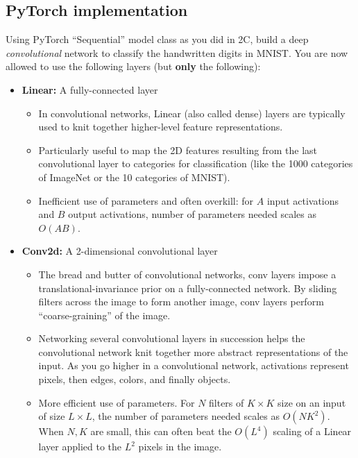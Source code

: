 \subsection{PyTorch implementation}
\problem[20]

Using PyTorch ``Sequential'' model class as you did in 2C, build a deep \emph{convolutional}
network to classify the handwritten digits in MNIST. You are now allowed to use
the following layers (but \textbf{only} the following):

 \begin{itemize}
  \item \textbf{Linear:} A fully-connected layer
  \begin{itemize}
    \item In convolutional networks, Linear (also called dense) layers are typically used to knit together higher-level feature representations.
    \item Particularly useful to map the 2D features resulting from the last convolutional layer to categories for classification (like the 1000 categories of ImageNet or the 10 categories of MNIST).
    \item Inefficient use of parameters and often overkill: for $A$ input activations and $B$ output activations, number of parameters needed scales as $O(AB)$.
  \end{itemize}
  \item \textbf{Conv2d:} A 2-dimensional convolutional layer
  \begin{itemize}
    \item The bread and butter of convolutional networks, conv layers impose a translational-invariance prior on a fully-connected network. By sliding filters across the image to form another image, conv layers perform ``coarse-graining'' of the image.
    \item Networking several convolutional layers in succession helps the convolutional network knit together more abstract representations of the input. As you go higher in a convolutional network, activations represent pixels, then edges, colors, and finally objects.
    \item More efficient use of parameters. For $N$ filters of $K \times K$ size on an input of size $L \times L$, the number of parameters needed scales as $O(N K^2)$. When $N, K$ are small, this can often beat the $O(L^4)$ scaling of a Linear layer applied to the $L^2$ pixels in the image.


\end{itemize}
\end{itemize}
